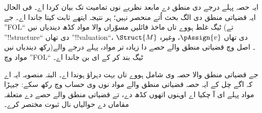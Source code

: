 \documentclass[../../include/open-logic-part]{subfiles}
\begin{document}

\begin{editorial}
  ایہ حصہ پہلے درجے دی منطق دے مابعد نظریے نوں
  تمامیت تک بیان کردا اے۔ فی الحال ایہ قضیاتی
  منطق دی الگ بحث اُتے منحصر نہیں؛ ہر نتیجہ ایتھے
  ثابت کیتا جاندا اے۔ جے ”FOL“ ٹیگ غلط ہووے
  تاں ماخذ فائلیں مسوّراں والا مواد کڈھ دیندیاں نیں
  (تے ”!!{structure}“ دی تھاں
  ”!!{valuation}“، $\Struct{M}$ دی تھاں
  $\pAssign{v}$، وغیرہ رکھ دیندیاں نیں)۔
  اصل وچ قضیاتی منطق والے حصے دا زیادہ تر
  مواد، پہلے درجے والے مواد وچ ”FOL“ ٹیگ
  بند کر کے ای بن جاندا اے۔

  جے قضیاتی منطق والا حصہ وی شامل ہووے
  تاں بہت دہراؤ ہوندا اے۔ البتہ منصوبہ ایہ
  اے کہ اگے چل کے ایہ حصہ قضیاتی منطق
  والے مواد نوں وی حساب وچ رکھ سکے:
  جیہڑا مواد پہلے ای آ چکیا اے اوہنوں
  اتھوں کڈھ دے، تے قضیاتی منطق والے
  حصے دے متعلقہ مقاماں دے حوالیاں نال
  ثبوت مختصر کرے۔
\end{editorial}












\OLEndPartHook
\end{document}
